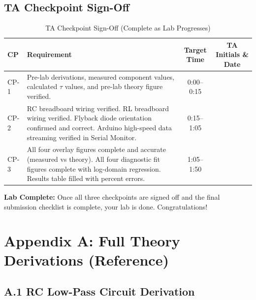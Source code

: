 \documentclass[11pt,letterpaper]{article}
\begin{document}
\subsection{TA Checkpoint Sign-Off}

\begin{table}[H]
    \centering
    \caption{TA Checkpoint Sign-Off (Complete as Lab Progresses)}
    \label{tab:checkpoints}
    \begin{tabularx}{\linewidth}{l X c c}
    \toprule
    \textbf{CP} & \textbf{Requirement} & \textbf{Target Time} & \textbf{TA Initials \& Date}\\
    \midrule
    CP-1 & Pre-lab derivations, measured component values, calculated $\tau$ values, and pre-lab theory figure verified. & 0:00--0:15 & \underline{\hspace{2.5cm}} \\[0.1in]
    CP-2 & RC breadboard wiring verified. RL breadboard wiring verified. Flyback diode orientation confirmed and correct. Arduino high-speed data streaming verified in Serial Monitor. & 0:15--1:05 & \underline{\hspace{2.5cm}} \\[0.1in]
    CP-3 & All four overlay figures complete and accurate (measured vs theory). All four diagnostic fit figures complete with log-domain regression. Results table filled with percent errors. & 1:05--1:50 & \underline{\hspace{2.5cm}} \\[0.1in]
    \bottomrule
    \end{tabularx}
\end{table}

\noindent
\textbf{Lab Complete:} Once all three checkpoints are signed off and the final submission checklist is complete, your lab is done. Congratulations!

\clearpage

\section*{Appendix A: Full Theory Derivations (Reference)}

\subsection*{A.1 RC Low-Pass Circuit Derivation}
\end{document}
